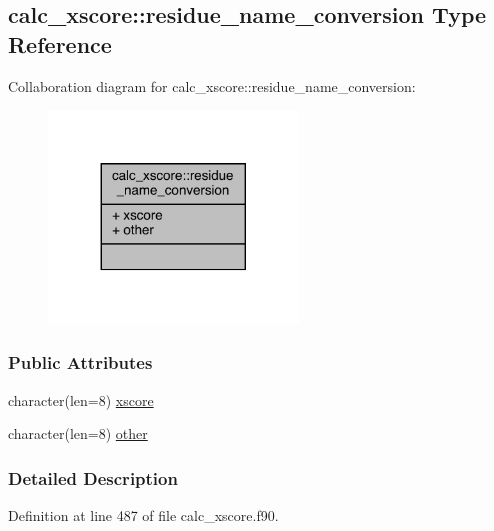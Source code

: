 \hypertarget{structcalc__xscore_1_1residue__name__conversion}{\subsection{calc\-\_\-xscore\-:\-:residue\-\_\-name\-\_\-conversion Type Reference}
\label{structcalc__xscore_1_1residue__name__conversion}
}


Collaboration diagram for calc\-\_\-xscore\-:\-:residue\-\_\-name\-\_\-conversion\-:
\nopagebreak
\begin{figure}[H]
\begin{center}
\leavevmode
\includegraphics[width=188pt]{structcalc__xscore_1_1residue__name__conversion__coll__graph}
\end{center}
\end{figure}
\subsubsection*{Public Attributes}
\begin{DoxyCompactItemize}
\item 
character(len=8) \hyperlink{structcalc__xscore_1_1residue__name__conversion_a8dc992df9772213fb3de3b69b79a93f9}{xscore}
\item 
character(len=8) \hyperlink{structcalc__xscore_1_1residue__name__conversion_a1a3dba91e23f89e2e1ba190da3f7375a}{other}
\end{DoxyCompactItemize}


\subsubsection{Detailed Description}


Definition at line 487 of file calc\-\_\-xscore.\-f90.



